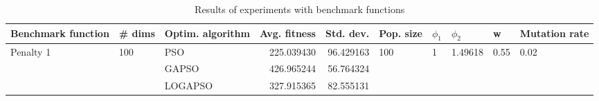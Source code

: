 \begin{table}
\centering
\caption{Results of experiments with benchmark functions}
\begin{tabular}{lllrrlllll}
\toprule
        Benchmark function &              \# dims & Optim. algorithm &  Avg. fitness &  Std. dev. &            Pop. size &         $\phi_{1}$ &               $\phi_{2}$ &                     w &         Mutation rate \\
\midrule
\multirow{3}{*}{Penalty 1} & \multirow{3}{*}{100} &              PSO &    225.039430 &  96.429163 & \multirow{3}{*}{100} & \multirow{3}{*}{1} & \multirow{3}{*}{1.49618} & \multirow{3}{*}{0.55} & \multirow{3}{*}{0.02} \\
                           &                      &            GAPSO &    426.965244 &  56.764324 &                      &                    &                          &                       &                       \\
                           &                      &          LOGAPSO &    327.915365 &  82.555131 &                      &                    &                          &                       &                       \\
\bottomrule
\end{tabular}
\end{table}
